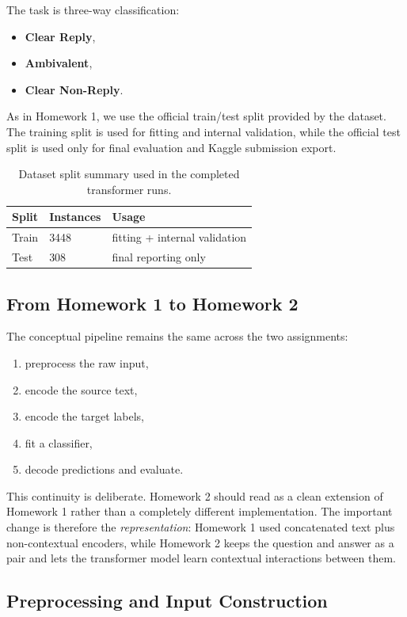 The task is three-way classification:
\begin{itemize}
	\item \textbf{Clear Reply},
	\item \textbf{Ambivalent},
	\item \textbf{Clear Non-Reply}.
\end{itemize}

As in Homework 1, we use the official train/test split provided by the dataset. The training split is used for fitting and internal validation, while the official test split is used only for final evaluation and Kaggle submission export.

\begin{table}[h]
\centering
\begin{tabular}{lll}
\toprule
Split & Instances & Usage \\
\midrule
Train & 3448 & fitting + internal validation \\
Test & 308 & final reporting only \\
\bottomrule
\end{tabular}
\caption{Dataset split summary used in the completed transformer runs.}
\label{tab:dataset-sizes}
\end{table}

\subsection{From Homework 1 to Homework 2}

The conceptual pipeline remains the same across the two assignments:
\begin{enumerate}
	\item preprocess the raw input,
	\item encode the source text,
	\item encode the target labels,
	\item fit a classifier,
	\item decode predictions and evaluate.
\end{enumerate}

This continuity is deliberate. Homework 2 should read as a clean extension of Homework 1 rather than a completely different implementation. The important change is therefore the \emph{representation}: Homework 1 used concatenated text plus non-contextual encoders, while Homework 2 keeps the question and answer as a pair and lets the transformer model learn contextual interactions between them.

\subsection{Preprocessing and Input Construction}

